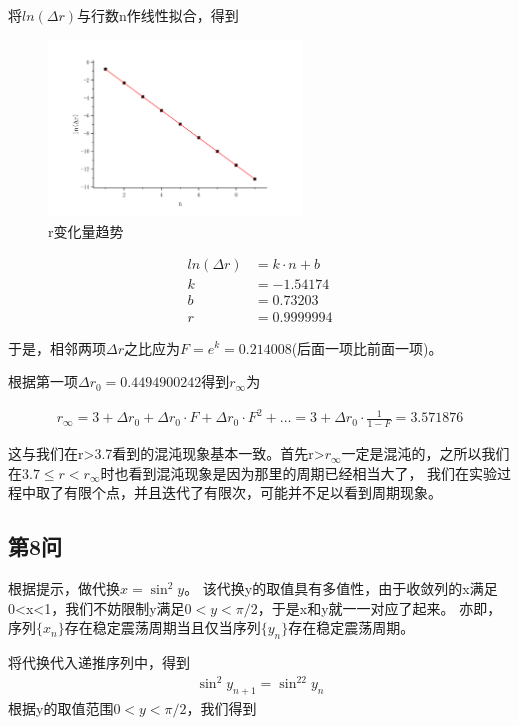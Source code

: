 \documentclass[10pt, a4paper]{article}
\begin{document}
    将$ln(\Delta r)$与行数n作线性拟合，得到

    \begin{figure}[H]
        \centering
        \includegraphics[width=0.6\textwidth]{r变化量趋势.jpg}
        \caption{r变化量趋势}
        \label{r变化量趋势}
    \end{figure}

    \begin{align}
        ln(\Delta r)&=k\cdot n+b\\
        k&=-1.54174\\
        b&=0.73203\\
        r&=0.9999994
    \end{align}

    于是，相邻两项$\Delta r$之比应为$F=e^k=0.214008$(后面一项比前面一项)。

    根据第一项$\Delta r_0=0.4494900242$得到$r_\infty$为

    \begin{align}
        r_\infty=3+\Delta r_0+\Delta r_0\cdot F+\Delta r_0\cdot F^2+\dots=3+\Delta r_0\cdot \frac{1}{1-F}=3.571876
    \end{align}

    这与我们在r>3.7看到的混沌现象基本一致。首先r>$r_\infty$一定是混沌的，之所以我们在$3.7\le r<r_\infty$时也看到混沌现象是因为那里的周期已经相当大了，
    我们在实验过程中取了有限个点，并且迭代了有限次，可能并不足以看到周期现象。

    \subsection{第8问}

    根据提示，做代换$x=\sin^2y$。
    该代换y的取值具有多值性，由于收敛列的x满足0<x<1，我们不妨限制y满足$0<y<\pi/2$，于是x和y就一一对应了起来。
    亦即，序列$\{x_n\}$存在稳定震荡周期当且仅当序列$\{y_n\}$存在稳定震荡周期。

    将代换代入递推序列中，得到
    \begin{align}
        \sin^2y_{n+1}=\sin^22y_n
    \end{align}
    根据y的取值范围$0<y<\pi/2$，我们得到
\end{document}

